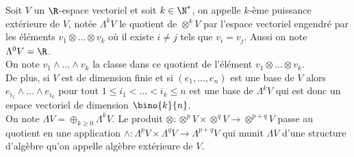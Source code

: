 \begin{defi}
Soit $V$ un $\R$-espace vectoriel et soit $k\in \N^*$, on appelle $k$-ème puissance extérieure de $V$, notée $\Lambda^k V$ le quotient de $\otimes^k V$ par l'espace vectoriel engendré par les éléments $v_1 \otimes ... \otimes v_k$ où il existe $i\neq j$ tels que $v_i = v_j$. Aussi on note $\Lambda^0 V = \R$.\\
On note $v_1 \wedge ... \wedge v_k$ la classe dans ce quotient de l'élément $v_1 \otimes ... \otimes v_k$. \\

De plus, si $V$ est de dimension finie et si $(e_1, ..., e_n)$ est une base de $V$ alors $e_{i_1} \wedge ... \wedge e_{i_k}$ pour tout $1 \leq i_1 < ... < i_k \leq n$ est une base de $\Lambda^k V$ qui est donc un espace vectoriel de dimension $\bino{k}{n}$. \\
On note $\Lambda V = \oplus_{k\geq 0} \Lambda^k V$. Le produit $\otimes : \otimes^p V\times \otimes^q V \to \otimes^{p+q} V$ passe au quotient en une application $\wedge : \Lambda^p V \times \Lambda^q V \to \Lambda^{p+q} V$ qui munit $\Lambda V$ d'une structure d'algèbre qu'on appelle algèbre extérieure de $V$.
\end{defi}

